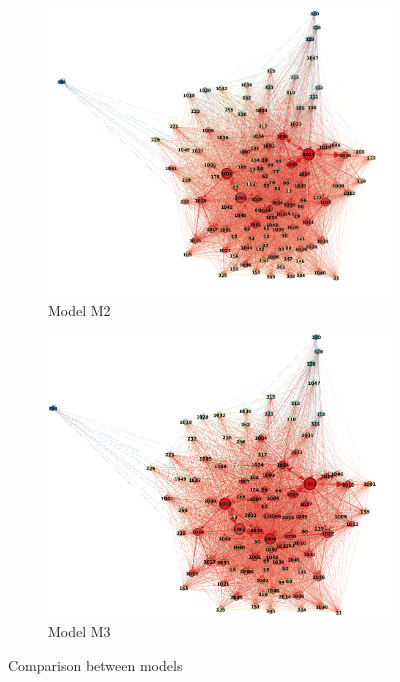 \documentclass[11pt,twoside]{report}
\begin{document}
\begin{figure}[H]
	\begin{subfigure}[H]{0.5\linewidth}
		\centering
		\includegraphics[width=133 mm]{pictures/M2_graph.png}
		\caption{Model M2}
	\end{subfigure}
	\vfill
	\begin{subfigure}[H]{0.5\linewidth}
		\centering
		\includegraphics[width=133 mm]{pictures/M3_graph.png}
		\caption{Model M3}
	\end{subfigure}%
	\caption{Comparison between models}
	\label{fig:comparison}
\end{figure}
\end{document}
